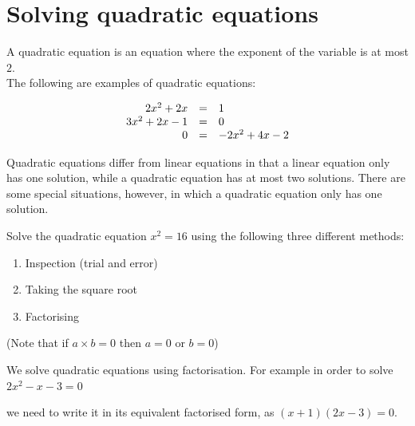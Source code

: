 \section{Solving quadratic equations}

A quadratic equation is an equation where the exponent of the variable is at most
$2$. \\The following are examples of quadratic equations:\par 


\begin{equation*}
    \begin{array}{ccl}\hfill 2{x}^{2}+2x& =& 1\hfill \\
	\hfill 3{x}^{2}+2x-1&=&0 \\ 
	\hfill 0&=&-2{x}^{2}+4x-2\hfill 
    \end{array}
\end{equation*}

Quadratic equations differ from linear equations in that a linear
equation only has one solution, while a quadratic equation has at most
two solutions. There are some special situations, however, in which a quadratic equation only
has one solution.

\begin{activity}{}
Solve the quadratic equation $x^{2}=16$ using the following three different methods:
\begin{enumerate}[noitemsep, label=\textbf{\arabic*}. ] 
\item Inspection (trial and error)
\item Taking the square root
\item Factorising
\end{enumerate}
(Note that if $a \times b = 0$ then $a = 0$ or $b=0$)
\end{activity}

We solve quadratic equations using factorisation. For example in order to solve $2{x}^{2}-x-3 = 0$

we need to write it in its equivalent factorised form, as $(x+1)(2x-3)=0$.


